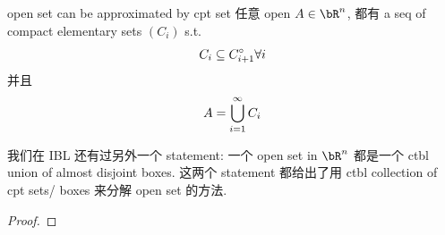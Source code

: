 \begin{lemma}{open set can be approximated by cpt set}
    任意 open $A \in \bR^n$, 都有 a seq of compact elementary sets $(C_i)$ s.t. 
    $$
    C_i \subseteq C_{i+1}^{\circ} \forall i
    $$
    并且
    $$
    A = \displaystyle\bigcup_{i=1}^\infty C_i
    $$
\end{lemma}

\begin{remark}
    我们在 IBL 还有过另外一个 statement: 一个 open set in $\bR^n$ 都是一个 ctbl union of almost disjoint boxes. 这两个 statement 都给出了用 ctbl collection of cpt sets/ boxes 来分解 open set 的方法.
\end{remark}

\begin{proof}
    
\end{proof}







